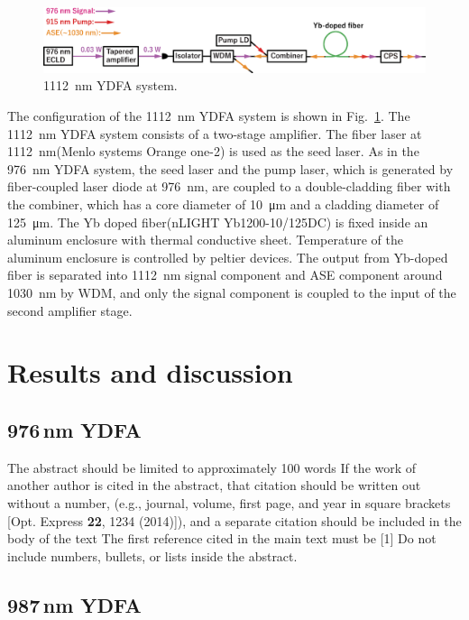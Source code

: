 \documentclass{osa-article}
\begin{document}
\begin{figure}[h!]
  \centering\includegraphics[width=\linewidth]{./Figure/976nmYDFASystem.eps}
  \caption{\SI{1112}{nm} YDFA system.}
  \label{fig:1112YDFASystem}
\end{figure}

The configuration of the \SI{1112}{nm} YDFA system is shown in Fig.~\ref{fig:1112YDFASystem}.
The \SI{1112}{nm} YDFA system consists of a two-stage amplifier.
The fiber laser at \SI{1112}{nm}(Menlo systems Orange one-2) is used as the seed laser.
As in the \SI{976}{nm} YDFA system, the seed laser and the pump laser, which is generated by fiber-coupled laser diode at \SI{976}{nm}, are coupled to a double-cladding fiber with the combiner, which has a core diameter of \SI{10}{\micro m} and a cladding diameter of \SI{125}{\micro m}.
The Yb doped fiber(nLIGHT Yb1200-10/125DC) is fixed inside an aluminum enclosure with thermal conductive sheet.
Temperature of the aluminum enclosure is controlled by peltier devices.
The output from Yb-doped fiber is separated into \SI{1112}{nm} signal component and ASE component around \SI{1030}{nm} by WDM, and only the signal component is coupled to the input of the second amplifier stage.


\section{Results and discussion}
\subsection{976\,nm YDFA}
The abstract should be limited to approximately 100 words
If the work of another author is cited in the abstract, that citation should be written out without a number, (e.g., journal, volume, first page, and year in square brackets [Opt. Express {\bfseries 22}, 1234 (2014)]), and a separate citation should be included in the body of the text
The first reference cited in the main text must be [1]
Do not include numbers, bullets, or lists inside the abstract.

\subsection{987\,nm YDFA}
\end{document}
